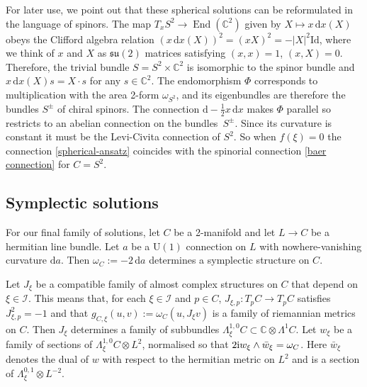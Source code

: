 \documentclass[pdftex]{sigma}
\newcommand{\II}{{\mathcal{I}}}
\newcommand{\su}{{\mathfrak{su}}}
\newcommand{\U}{{\mathrm{U}}}
\newcommand{\C}{{\mathbb{C}}}
\newcommand{\1}{{\mathbb{1}}}
\def \d{\mathrm{d}}
\numberwithin{equation}{section}
\begin{document}
For later use, we point out that these spherical solutions can be reformulated in the language of spinors. The map $T_xS^2\to \operatorname{End}(\C^2)$ given by $X\mapsto x\,\d x(X)$ obeys the Clifford algebra relation $(x\,\d x(X))^2= (xX)^2 =-|X|^2\mathrm{Id}$, where we think of $x$ and $X$ as $\su(2)$ matrices satisfying $(x,x)=1$, $(x,X)=0$. Therefore, the trivial bundle $S=S^2\times \C^2$ is isomorphic to the spinor bundle and $x\,\d x(X)s=X\cdot s$ for any $s\in\C^2$. The endomorphism $\Phi$ corresponds to multiplication with the area 2-form $\omega_{S^2}$, and its eigenbundles are therefore the bundles $S^\pm$ of chiral spinors. The connection $\d-\frac12x\,\d x$ makes $\Phi$ parallel so restricts to an abelian connection on the bundles~$S^\pm$. Since its curvature is constant it must be the Levi-Civita connection of $S^2$. So when $f(\xi)=0$ the connection \eqref{spherical-ansatz} coincides with the spinorial connection \eqref{baer connection} for $C=S^2$.

\subsection{Symplectic solutions}
\label{sec:symplectic}
For our final family of solutions, let $C$ be a 2-manifold and let $L\to C$ be a hermitian line bundle. Let $a$ be a $\U(1)$ connection on $L$ with nowhere-vanishing curvature $\d a$. Then $\omega_C:=-2\,\d a$ determines a symplectic structure on $C$.

Let $J_\xi$ be a compatible family of almost complex structures on $C$ that depend on $\xi\in\II$. This means that, for each $\xi\in\II$ and $p\in C$, $J_{\xi,p}\colon T_pC\to T_p C$ satisfies $J_{\xi,p}^2=-1$ and that $g_{C,\xi}(u,v):=\omega_C(u,J_\xi v)$ is a family of riemannian metrics on $C$. Then $J_\xi$ determines a family of subbundles $\Lambda^{1,0}_\xi C\subset\C\otimes\Lambda^1C$. Let $w_\xi$ be a family of sections of $\Lambda^{1,0}_\xi C\otimes L^2$, normalised so that $2{\rm i}w_\xi\wedge\bar{w}_\xi=\omega_C$. Here $\bar{w}_\xi$ denotes the dual of $w$ with respect to the hermitian metric on $L^2$ and is a section of $\Lambda^{0,1}_\xi\otimes L^{-2}$.
\end{document}
